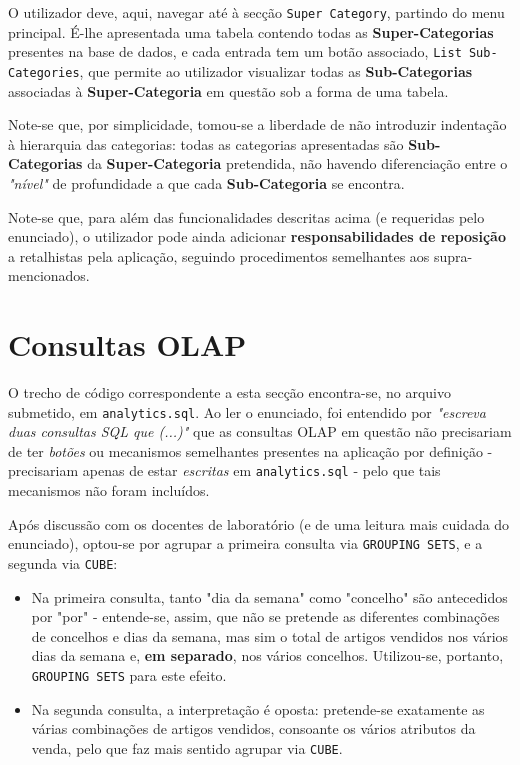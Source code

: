 \documentclass[12pt,a4paper]{article}
\begin{document}
\begin{enumerate}
        O utilizador deve, aqui, navegar até à secção \texttt{Super Category},
        partindo do menu principal. É-lhe apresentada uma tabela contendo todas as
        \textbf{Super-Categorias} presentes na base de dados, e cada entrada tem um
        botão associado, \texttt{List Sub-Categories}, que permite ao utilizador
        visualizar todas as \textbf{Sub-Categorias} associadas à \textbf{Super-Categoria}
        em questão sob a forma de uma tabela.

        Note-se que, por simplicidade, tomou-se a liberdade de não introduzir indentação
        à hierarquia das categorias: todas as categorias apresentadas são
        \textbf{Sub-Categorias} da \textbf{Super-Categoria} pretendida, não havendo diferenciação
        entre o \textit{"nível"} de profundidade a que cada \textbf{Sub-Categoria} se encontra.

\end{enumerate}

Note-se que, para além das funcionalidades descritas acima (e requeridas pelo enunciado),
o utilizador pode ainda adicionar \textbf{responsabilidades de reposição} a retalhistas
pela aplicação, seguindo procedimentos semelhantes aos supra-mencionados.


\section*{Consultas OLAP}

O trecho de código correspondente a esta secção encontra-se, no arquivo submetido,
em \texttt{analytics.sql}. Ao ler o enunciado, foi entendido por \textit{"escreva
  duas consultas SQL que (...)"} que as consultas OLAP em questão não precisariam
de ter \textit{botões} ou mecanismos semelhantes presentes na aplicação por
definição - precisariam apenas de estar \textit{escritas} em \texttt{analytics.sql} -
pelo que tais mecanismos não foram incluídos.

Após discussão com os docentes de laboratório (e de uma leitura mais cuidada do enunciado),
optou-se por agrupar a primeira consulta via \texttt{GROUPING SETS}, e a segunda via
\texttt{CUBE}:

\begin{itemize}
  \item Na primeira consulta, tanto "dia da semana" como "concelho" são antecedidos
  por "por" - entende-se, assim, que não se pretende as diferentes combinações
  de concelhos e dias da semana, mas sim o total de artigos vendidos nos vários dias
  da semana e, \textbf{em separado}, nos vários concelhos. Utilizou-se, portanto,
  \texttt{GROUPING SETS} para este efeito.
  \item Na segunda consulta, a interpretação é oposta: pretende-se exatamente as
  várias combinações de artigos vendidos, consoante os vários atributos da venda,
  pelo que faz mais sentido agrupar via \texttt{CUBE}.
\end{itemize}
\end{document}
